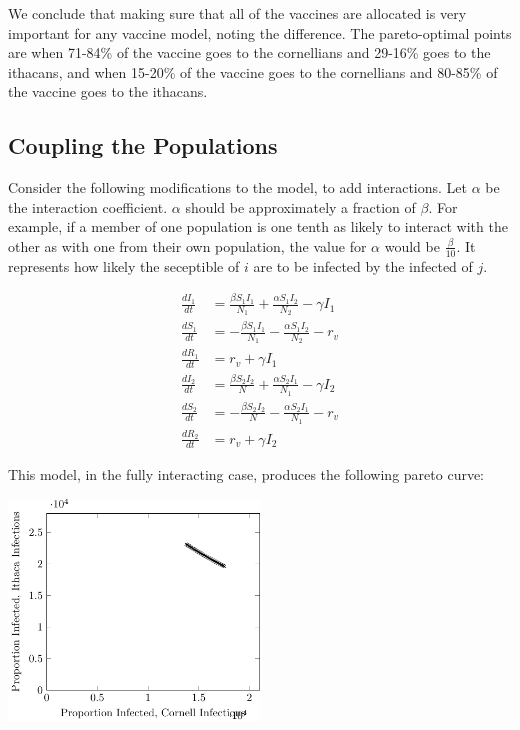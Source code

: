 \documentclass{article}
\begin{document}
We conclude that making sure that all of the vaccines are allocated is very
	important for any vaccine model, noting the difference.
The pareto-optimal points are when 71-84\% of the vaccine goes to the
	cornellians and 29-16\% goes to the ithacans,
	and when 15-20\% of the vaccine goes to the cornellians
	and 80-85\% of the vaccine goes to the ithacans.

\subsection{Coupling the Populations}

Consider the following modifications to the model, to add interactions.
Let $\alpha$ be the interaction coefficient.
$\alpha$ should be approximately a fraction of $\beta$.
For example, if a member of one population is one tenth as likely
	to interact with the other as with one from their own population,
	the value for $\alpha$ would be $\frac{\beta}{10}$.
It represents how likely the seceptible of $i$ are to be infected by the
	infected of $j$.

\begin{align*}
\frac{dI_1}{dt} & = \frac{ \beta S_1 I_1}{N_1} + \frac{ \alpha S_1 I_2 }{N_2} - \gamma I_1\\
\frac{dS_1}{dt} & = -\frac{\beta S_1 I_1}{N_1}  - \frac{ \alpha S_1 I_2 }{N_2} - r_v \\
\frac{dR_1}{dt} & = r_v + \gamma I_1 \\
\frac{dI_2}{dt} & = \frac{ \beta S_2 I_2}{N}  + \frac{ \alpha S_2 I_1 }{N_1} - \gamma I_2\\
\frac{dS_2}{dt} & = -\frac{\beta S_2 I_2}{N}  - \frac{ \alpha S_2 I_1 }{N_1} - r_v \\
\frac{dR_2}{dt} & = r_v + \gamma I_2
\end{align*}

This model, in the fully interacting case, produces the following pareto curve:

\includegraphics[width=0.5\textwidth]{figures/sir-interacting.pdf}
\end{document}
